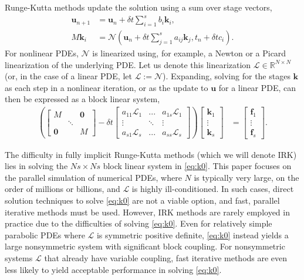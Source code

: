 \documentclass[review]{siamart}
\begin{document}
Runge-Kutta methods update the solution using a sum over stage vectors,
%
\begin{align*}
\mathbf{u}_{n+1} & = \mathbf{u}_n + \delta t \sum_{i=1}^s b_i\mathbf{k}_i, \\
M\mathbf{k}_i & = \mathcal{N}\left(\mathbf{u}_n + \delta t\sum_{j=1}^s a_{ij}\mathbf{k}_j, t_n+\delta tc_i\right).
\end{align*}
%
For nonlinear PDEs, $\mathcal{N}$ is linearized using, for example, a Newton or a Picard
linearization of the underlying PDE. Let us denote this linearization $\mathcal{L}\in\mathbb{R}^{N\times N}$
(or, in the case of a linear PDE, let $\mathcal{L} := \mathcal{N}$).
Expanding, solving for the stages $\mathbf{k}$ as each step in a nonlinear iteration, or
as the update to $\mathbf{u}$ for a linear PDE, can then be expressed as a block linear system,
%
\begin{align}\label{eq:k0}
\left( \begin{bmatrix} M  & & \mathbf{0} \\ & \ddots \\ \mathbf{0} & & M\end{bmatrix}
	- \delta t \begin{bmatrix} a_{11}\mathcal{L}_1 & ... & a_{1s}\mathcal{L}_1 \\
	\vdots & \ddots & \vdots \\ a_{s1}\mathcal{L}_s & ... & a_{ss} \mathcal{L}_s \end{bmatrix} \right)
	\begin{bmatrix} \mathbf{k}_1 \\ \vdots \\ \mathbf{k}_s \end{bmatrix} 
& = \begin{bmatrix} \mathbf{f}_1 \\ \vdots \\ \mathbf{f}_s \end{bmatrix}.
\end{align}
%

The difficulty in fully implicit Runge-Kutta methods (which we will denote IRK) lies in
solving the $Ns\times Ns$ block linear system in \eqref{eq:k0}. This paper focuses on the
parallel simulation of numerical PDEs, where $N$ is typically very large, on the order of
millions or billions, and $\mathcal{L}$ is highly ill-conditioned. In such cases, direct
solution techniques to solve \eqref{eq:k0} are not a viable option, and fast, parallel 
iterative methods must be used. However, IRK methods are rarely employed in practice due
to the difficulties of solving \eqref{eq:k0}. Even for relatively simple
parabolic PDEs where $\mathcal{L}$ is symmetric positive definite, \eqref{eq:k0}
instead yields a large nonsymmetric system with significant block coupling. For
nonsymmetric systems $\mathcal{L}$ that already have variable coupling, fast iterative
methods are even less likely to yield acceptable performance in solving \eqref{eq:k0}.
\end{document}
